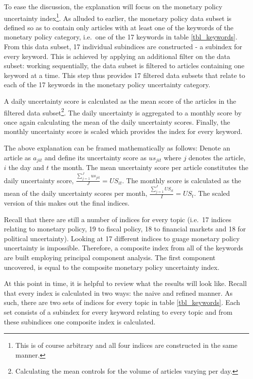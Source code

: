 \documentclass[11pt,preprint, authoryear]{elsarticle}
\numberwithin{equation}{section}
\numberwithin{figure}{section}
\numberwithin{table}{section}
\let\rmarkdownfootnote\footnote%
\def\footnote{\protect\rmarkdownfootnote}
\begin{document}
To ease the discussion, the explanation will focus on the monetary
policy uncertainty index\footnote{This is of course arbitrary and all
  four indices are constructed in the same manner.}. As alluded to
earlier, the monetary policy data subset is defined so as to contain
only articles with at least one of the keywords of the monetary policy
category, i.e.~one of the 17 keywords in table \ref{tbl_keywords}. From
this data subset, 17 individual subindices are constructed - a subindex
for every keyword. This is achieved by applying an additional filter on
the data subset: working sequentially, the data subset is filtered to
articles containing one keyword at a time. This step thus provides 17
filtered data subsets that relate to each of the 17 keywords in the
monetary policy uncertainty category.

A daily uncertainty score is calculated as the mean score of the
articles in the filtered data subset\footnote{Calculating the mean
  controls for the volume of articles varying per day.}. The daily
uncertainty is aggregated to a monthly score by once again calculating
the mean of the daily uncertainty scores. Finally, the monthly
uncertainty score is scaled which provides the index for every keyword.

The above explanation can be framed mathematically as follows: Denote an
article as \(a_{jit}\) and define its uncertainty score as \(us_{jit}\)
where \(j\) denotes the article, \(i\) the day and \(t\) the month. The
mean uncertainty score per article constitutes the daily uncertainty
score, \(\frac{\sum_{j=1}^Jus_{jit}}{J}= US_{it}\). The monthly score is
calculated as the mean of the daily uncertainty scores per month,
\(\frac{\sum_{j=1}^JUS_{it}}{I}= US_{t}\). The scaled version of this
makes out the final indices.

Recall that there are still a number of indices for every topic (i.e.~17
indices relating to monetary policy, 19 to fiscal policy, 18 to
financial markets and 18 for political uncertainty). Looking at 17
different indices to guage monetary policy uncertainty is impossible.
Therefore, a composite index from all of the keywords are built
employing principal component analysis. The first component uncovered,
is equal to the composite monetary policy uncertainty index.

At this point in time, it is helpful to review what the results will
look like. Recall that every index is calculated in two ways: the naive
and refined manner. As such, there are two sets of indices for every
topic in table \ref{tbl_keywords}. Each set consists of a subindex for
every keyword relating to every topic and from these subindices one
composite index is calculated.
\end{document}

